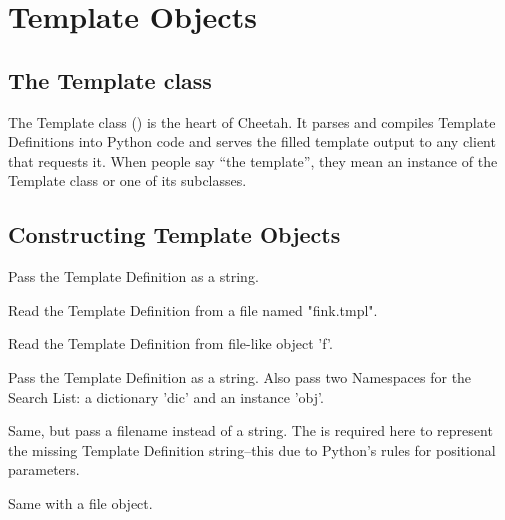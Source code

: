 \section{Template Objects}
\label{TSobjects}

\subsection{The Template class}

The Template class () is the heart of Cheetah.
It parses and compiles Template Definitions into Python code and serves the
filled template output to any client that requests it.  When people say ``the
template'', they mean an instance of the Template class or one of its
subclasses.


\subsection{Constructing Template Objects}

\begin{description}

\item{}
     Pass the Template Definition as a string.

\item{}
     Read the Template Definition from a file named "fink.tmpl".
     
\item{}
     Read the Template Definition from file-like object 'f'.
     
\item{}
     Pass the Template Definition as a string.  Also pass two Namespaces for the
     Search List: a dictionary 'dic' and an instance 'obj'.
     
\item{}
     Same, but pass a filename instead of a string.  The  is required
     here to represent the missing Template Definition string--this due to
     Python's rules for positional parameters.
     
\item{}
     Same with a file object.

\end{description}



